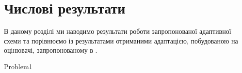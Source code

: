 
\section{Числові результати}

В даному розділі ми наводимо результати роботи запропонованої адаптивної схеми та порівнюємо
	із результатами отриманими адаптацією, побудованою на оцінювачі, запропонованому в \cite{OstShynAee11}.

{Problem1}
